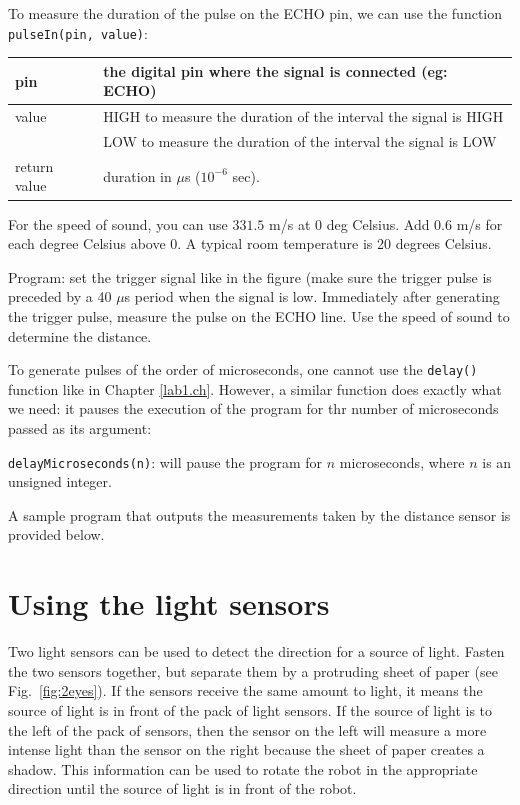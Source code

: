 \documentclass[12pt]{book}
\begin{document}
\begin{compactitem}[--]
\item To measure the duration of the pulse on the ECHO pin, we can use the
function \lstinline$pulseIn(pin, value)$:

\begin{tabular}{l | l}
  pin & the digital pin where the signal is connected (eg: ECHO) \\ \hline
  value & HIGH to measure the duration of the interval the signal is
  HIGH \\
  & LOW to measure the duration of the interval the signal is LOW
  \\ \hline
  return value & duration in $\mu$s ($10^{-6}$ sec). 
\end{tabular}

\item For the speed of sound, you can 
  use $331.5$ m/s at 0 deg Celsius. Add 0.6 m/s for each degree Celsius
  above 0. A typical room temperature is 20 degrees Celsius.

\item  Program: set the trigger signal like in the figure (make sure the
  trigger pulse is preceded by a 40 $\mu$s period when the signal is
  low. Immediately after generating the trigger pulse, measure the
  pulse on the ECHO line. Use the speed of sound to determine the
  distance.

\item  To generate pulses of the order of microseconds, one cannot use
  the \lstinline$delay()$ function like in Chapter
  \ref{lab1.ch}. However, a similar function does exactly what we
  need: it pauses the execution of the program for thr number of
  microseconds passed as its argument:

  \lstinline$delayMicroseconds(n)$: will pause the program for $n$
  microseconds, where $n$ is an unsigned integer.
\end{compactitem}

A sample program that outputs the measurements taken by the distance sensor is provided below.




\section{Using the light sensors}

Two light sensors can be used to detect the direction for a source of
light.  Fasten the two sensors together, but separate them by a
protruding sheet of paper (see Fig.~\ref*{fig:2eyes}).  If the sensors
receive the same amount to light, it means the source of light is in
front of the pack of light sensors. If the source of light is to the
left of the pack of sensors, then the sensor on the left will measure
a more intense light than the sensor on the right because the sheet
of paper creates a shadow. This information can be used to rotate the
robot in the appropriate direction until the source of light is in
front of the robot.
\end{document}
